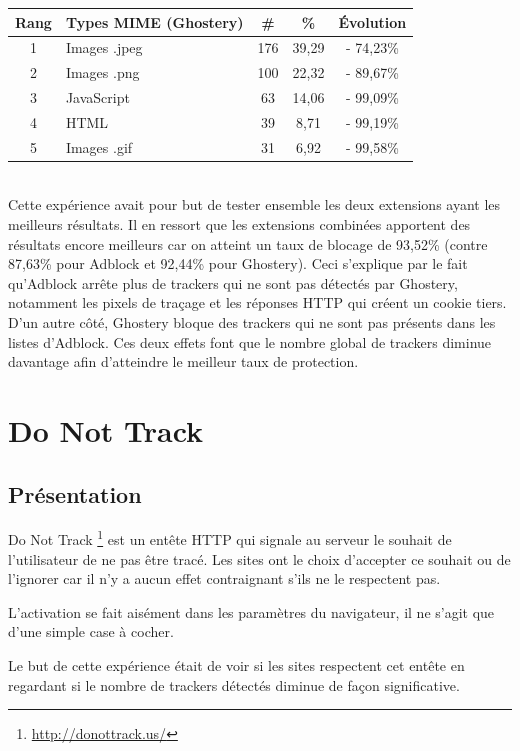 \begin{tabular}{ c | p{5cm} | c | c | c | }
   Rang & Types MIME (Ghostery) & \# & \% & Évolution\\
   \hline
   \hline
   1 & Images .jpeg & 176 & 39,29 & - 74,23\% \\
   2 & Images .png & 100 & 22,32 & - 89,67\% \\
   3 & JavaScript & 63 & 14,06 & - 99,09\% \\
   4 & HTML & 39 & 8,71 & - 99,19\% \\
   5 & Images .gif & 31 & 6,92 & - 99,58\% \\
   \hline
\end{tabular}
\\[.3cm]

Cette expérience avait pour but de tester ensemble les deux extensions ayant les meilleurs résultats. Il en ressort que les extensions combinées apportent des résultats encore meilleurs car on atteint un taux de blocage de 93,52\% (contre 87,63\% pour Adblock et 92,44\% pour Ghostery). Ceci s'explique par le fait qu'Adblock arrête plus de trackers qui ne sont pas détectés par Ghostery, notamment les pixels de traçage et les réponses HTTP qui créent un cookie tiers. D'un autre côté, Ghostery bloque des trackers qui ne sont pas présents dans les listes d'Adblock. Ces deux effets font que le nombre global de trackers diminue davantage afin d'atteindre le meilleur taux de protection.


\section{Do Not Track}
\subsection{Présentation}
Do Not Track \footnote{\url{http://donottrack.us/}} est un entête HTTP qui signale au serveur le souhait de l'utilisateur de ne pas être tracé. Les sites ont le choix d'accepter ce souhait ou de l'ignorer car il n'y a aucun effet contraignant s'ils ne le respectent pas.

L'activation se fait aisément dans les paramètres du navigateur, il ne s'agit que d'une simple case à cocher.

Le but de cette expérience était de voir si les sites respectent cet entête en regardant si le nombre de trackers détectés diminue de façon significative.

